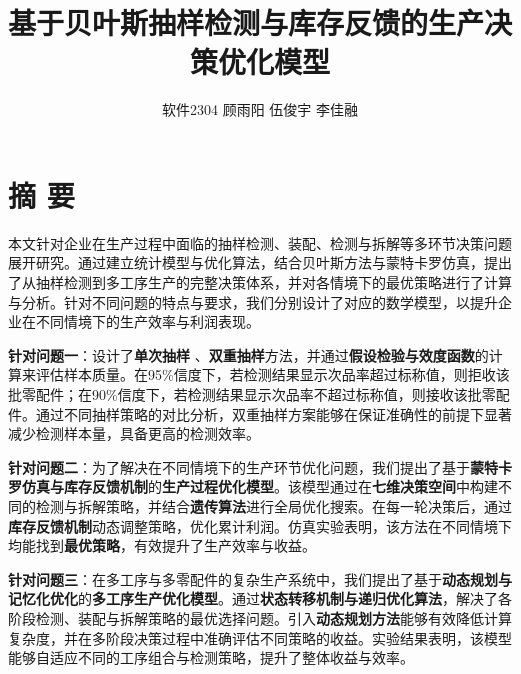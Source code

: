 \documentclass{article}
\title{基于贝叶斯抽样检测与库存反馈的生产决策优化模型}
\author{软件2304 顾雨阳 伍俊宇 李佳融}
\date{}  %
\begin{document}
	 \maketitle
	  
	   
	     
	  	\section*{\centering 摘 \hspace{0.5em} 要}
	  
	\vspace{1.5em}  %
	 
	 本文针对企业在生产过程中面临的抽样检测、装配、检测与拆解等多环节决策问题展开研究。通过建立统计模型与优化算法，结合贝叶斯方法与蒙特卡罗仿真，提出了从抽样检测到多工序生产的完整决策体系，并对各情境下的最优策略进行了计算与分析。针对不同问题的特点与要求，我们分别设计了对应的数学模型，以提升企业在不同情境下的生产效率与利润表现。
	 
	 \vspace{1.5em}  %
	 
	 \noindent \textbf{针对问题一}：设计了\textbf{单次抽样} 、\textbf{双重抽样}方法，并通过\textbf{假设检验与效度函数}的计算来评估样本质量。在95\%信度下，若检测结果显示次品率超过标称值，则拒收该批零配件；在90\%信度下，若检测结果显示次品率不超过标称值，则接收该批零配件。通过不同抽样策略的对比分析，双重抽样方案能够在保证准确性的前提下显著减少检测样本量，具备更高的检测效率。
	 
	 \vspace{1.5em}  %
	 
	 \noindent \textbf{针对问题二}：为了解决在不同情境下的生产环节优化问题，我们提出了基于\textbf{蒙特卡罗仿真与库存反馈机制}的\textbf{生产过程优化模型}。该模型通过在\textbf{七维决策空间}中构建不同的检测与拆解策略，并结合\textbf{遗传算法}进行全局优化搜索。在每一轮决策后，通过\textbf{库存反馈机制}动态调整策略，优化累计利润。仿真实验表明，该方法在不同情境下均能找到\textbf{最优策略}，有效提升了生产效率与收益。
	 
	 \vspace{1.5em}  %
	 
	 \noindent \textbf{针对问题三}：在多工序与多零配件的复杂生产系统中，我们提出了基于\textbf{动态规划与记忆化优化}的\textbf{多工序生产优化模型}。通过\textbf{状态转移机制与递归优化算法}，解决了各阶段检测、装配与拆解策略的最优选择问题。引入\textbf{动态规划方法}能够有效降低计算复杂度，并在多阶段决策过程中准确评估不同策略的收益。实验结果表明，该模型能够自适应不同的工序组合与检测策略，提升了整体收益与效率。
	 
\end{document}
